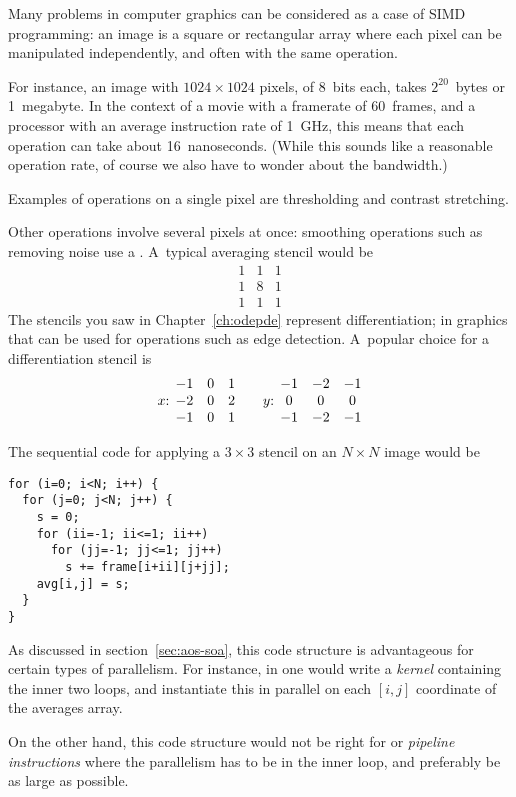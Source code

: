 
Many problems in computer graphics can be
considered as a case of \ac{SIMD} programming:
an image is a square or rectangular array
where each pixel can be manipulated independently,
and often with the same operation.

For instance, an image with $1024\times 1024$
pixels, of 8~bits each, takes $2^20$~bytes or 1~megabyte.
In the context of a movie with a framerate of 60~frames,
and a processor with an average instruction rate
of 1~GHz, this means that each operation can take about 16~nanoseconds.
%
(While this sounds like a reasonable operation rate,
of course we also have to wonder about the bandwidth.)

Examples of operations on a single pixel are
thresholding and contrast stretching.

Other operations involve several pixels at once:
smoothing operations such as removing noise
use a .
A~typical averaging stencil would be 
\[
\begin{matrix}
  1&1&1\\ 1&8&1\\ 1&1&1
\end{matrix}
\]
The stencils you saw in Chapter~\ref{ch:odepde} represent
differentiation; in graphics that can be used for operations
such as edge detection. A~popular choice for a differentiation stencil is
\[
\hbox{$x$: }
\begin{matrix}
  -1&0&1\\ -2&0&2\\ -1&0&1
\end{matrix}
\qquad\hbox{$y$: }
\begin{matrix}
  -1&-2&-1\\ 0&0&0\\ -1&-2&-1
\end{matrix}
\]


The sequential code for applying a $3\times 3$ stencil
on an $N\times N$ image
would be
\begin{verbatim}
for (i=0; i<N; i++) {
  for (j=0; j<N; j++) {
    s = 0;
    for (ii=-1; ii<=1; ii++)
      for (jj=-1; jj<=1; jj++)
        s += frame[i+ii][j+jj];
    avg[i,j] = s;
  }
}
\end{verbatim}

As discussed in section~\ref{sec:aos-soa}, this code structure
is advantageous for certain types of parallelism. For instance,
in  one would write a \emph{kernel}
containing the inner two loops, and instantiate this
in parallel on each $[i,j]$ coordinate of the averages array.

On the other hand, this code structure would not be right for
 or \emph{pipeline
  instructions} where the parallelism has
to be in the inner loop, and preferably be as large as possible.

